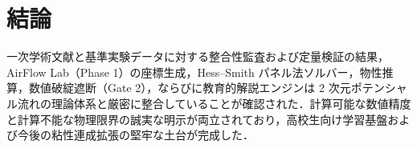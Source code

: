 \documentclass[10pt,a4paper]{article}
\begin{document}
\section{結論}

一次学術文献と基準実験データに対する整合性監査および定量検証の結果，AirFlow Lab（Phase 1）の座標生成，Hess--Smith パネル法ソルバー，物性推算，数値破綻遮断（Gate 2），ならびに教育的解説エンジンは 2 次元ポテンシャル流れの理論体系と厳密に整合していることが確認された．計算可能な数値精度と計算不能な物理限界の誠実な明示が両立されており，高校生向け学習基盤および今後の粘性連成拡張の堅牢な土台が完成した．

\begingroup
\raggedright
\end{document}
